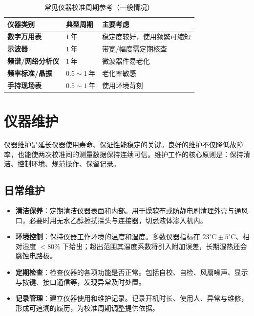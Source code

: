 \begin{table}[htbp]
    \centering
    \caption{常见仪器校准周期参考（一般情况）}
    \begin{tabular}{|p{4.4cm}|p{3.6cm}|p{4.0cm}|}
        \hline
        \textbf{仪器类别} & \textbf{典型周期} & \textbf{主要考虑} \\
        \hline
        \textbf{数字万用表} & $1\,\mathrm{年}$ & 稳定度较好，使用频繁可缩短 \\
        \hline
        \textbf{示波器} & $1\,\mathrm{年}$ & 带宽/幅度需定期核查 \\
        \hline
        \textbf{频谱/网络分析仪} & $1\,\mathrm{年}$ & 微波器件易老化 \\
        \hline
        \textbf{频率标准/晶振} & $0.5\sim1\,\mathrm{年}$ & 老化率敏感 \\
        \hline
        \textbf{手持现场表} & $0.5\sim1\,\mathrm{年}$ & 使用环境苛刻 \\
        \hline
    \end{tabular}
\end{table}

\section{仪器维护}
\label{sec:instrument_maintenance}

仪器维护是延长仪器使用寿命、保证性能稳定的关键。良好的维护不仅降低故障率，也能使两次校准间的测量数据保持连续可信。维护工作的核心原则是：保持清洁、控制环境、规范操作、保留记录。

\subsection{日常维护}

\begin{itemize}
    \item \textbf{清洁保养}：定期清洁仪器表面和内部。用干燥软布或防静电刷清理外壳与通风口，必要时用无水乙醇擦拭探头与连接器，切忌液体渗入机内。
    \item \textbf{环境控制}：保持仪器工作环境的温度和湿度。多数仪器指标在 $23^\circ\mathrm{C}\pm5^\circ\mathrm{C}$、相对湿度 $<80\%$ 下给出；超出范围其温度系数将引入附加误差，长期湿热还会腐蚀电路板。
    \item \textbf{定期检查}：检查仪器的各项功能是否正常。包括自校、自检、风扇噪声、显示与按键、接口通信等，发现异常及时处置。
    \item \textbf{记录管理}：建立仪器使用和维护记录。记录开机时长、使用人、异常与维修，形成可追溯的履历，为校准周期调整提供依据。
\end{itemize}

